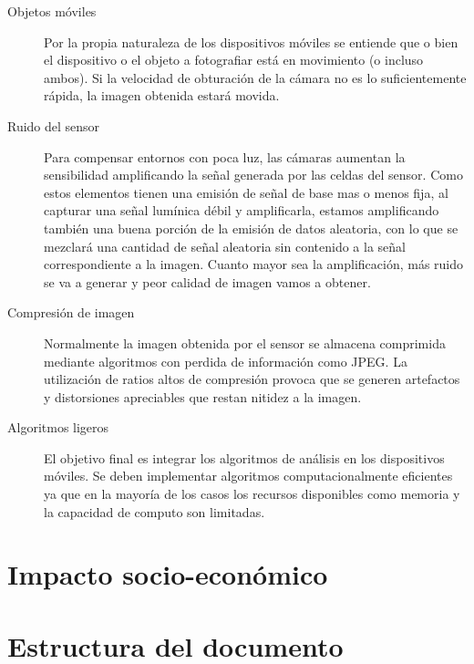 \begin{description}
\item[Objetos móviles] Por la propia naturaleza de los dispositivos móviles se entiende que o bien el dispositivo o el objeto a fotografiar está en movimiento (o incluso ambos). Si la velocidad de obturación de la cámara no es lo suficientemente rápida, la imagen obtenida estará movida.
\item[Ruido del sensor] Para compensar entornos con poca luz, las cámaras aumentan la sensibilidad amplificando la señal generada por las celdas del sensor. Como estos elementos tienen una emisión de señal de base mas o menos fija, al capturar una señal lumínica débil y amplificarla, estamos amplificando también una buena porción de la emisión de datos aleatoria, con lo que se mezclará una cantidad de señal aleatoria sin contenido a la señal correspondiente a la imagen. Cuanto mayor sea la amplificación, más ruido se va a generar y peor calidad de imagen vamos a obtener. 
\item[Compresión de imagen] Normalmente la imagen obtenida por el sensor se almacena comprimida mediante algoritmos con perdida de información como JPEG. La utilización de ratios altos de compresión provoca que se generen artefactos y distorsiones apreciables que restan nitidez a la imagen.
\item[Algoritmos ligeros] El objetivo final es integrar los algoritmos de análisis en los dispositivos móviles. Se deben implementar algoritmos computacionalmente eficientes ya que en la mayoría de los casos los recursos disponibles como memoria  y la capacidad de computo son limitadas.
\end{description}


\section{Impacto socio-económico}








\section{Estructura del documento}

